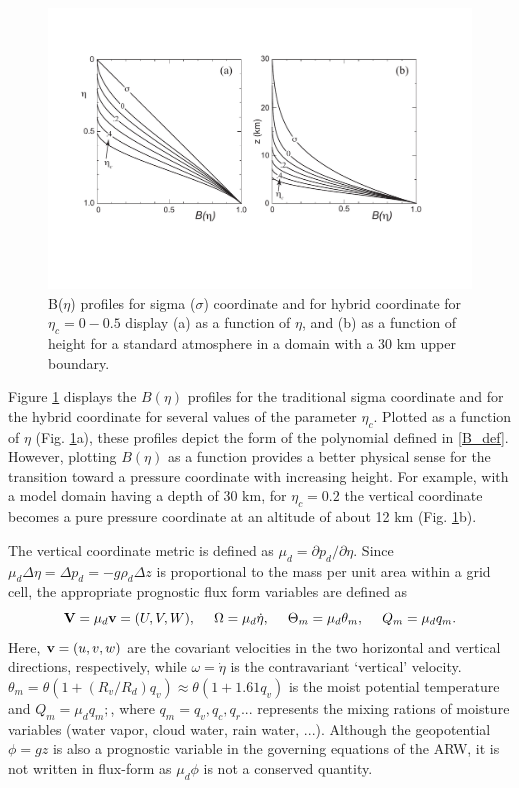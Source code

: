 \begin{figure}
\centerline{\includegraphics[width=38pc]{figures/B_profile.pdf}}
\caption{\label{figure:B_profile}B($\eta$) profiles for sigma ($\sigma$) coordinate and for hybrid coordinate for $\eta_c=0-0.5$ display (a) as a function of $\eta$, and (b) as a function of height for a standard atmosphere in a domain with a 30 km upper boundary.}
\end{figure}

Figure \ref{figure:B_profile} displays the $B(\eta)$ profiles for the traditional sigma coordinate and for the hybrid coordinate for several values of the parameter $\eta_c$. Plotted as a function of $\eta$ (Fig. \ref{figure:B_profile}a), these profiles depict the form of the polynomial defined in \eqref{B_def}. However, plotting $B(\eta)$ as a function provides a better physical sense for the transition toward a pressure coordinate with increasing height. For example, with a model domain having a depth of 30 km, for $\eta_c=0.2$ the vertical coordinate becomes a pure pressure coordinate at an altitude of about 12 km (Fig. \ref{figure:B_profile}b).

%
The vertical coordinate metric is defined as $\mu_d= \partial p_d/\partial\eta$. 
Since $\mu_d \Delta\eta=\Delta p_d=-g\rho_d \Delta z$ is proportional to the mass per unit area within a
grid cell, the appropriate prognostic flux form variables are defined as
%
\begin{equation}
 \hbox{\bf V} = \mu_d \hbox{\bf  v} =(U,V,W), ~~~~ \Omega = \mu_d\dot\eta, ~~~~ 
     \Theta_m = \mu_d \theta_m, ~~~~ Q_m = \mu_d q_m.                                      
\end{equation}
%
\noindent
Here, ${\hbox{\bf v}} = (u,v,w)$ are the covariant velocities in the two
horizontal and vertical directions, respectively, while 
$\omega = \dot\eta$ is the contravariant `vertical' velocity.  $\theta_m = \theta (1 + (R_v/R_d) q_v) 
\approx \theta (1 + 1.61 q_v)$ is the moist potential temperature and $Q_m = \mu_d q_m;$, where $q_m = q_v, q_c,
q_r ...$ represents the mixing rations of moisture variables (water vapor, cloud water, rain water, ...).  Although the geopotential $\phi=gz$ is also a prognostic variable in the governing equations of the ARW, it is not written in flux-form as $\mu_d\phi$ is not a conserved quantity. 
 
